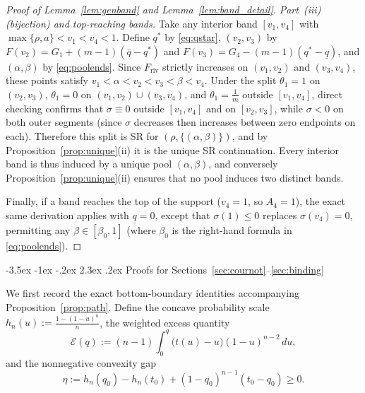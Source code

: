 \documentclass[12pt]{article}
\makeatletter
\theoremstyle{mystyle}
\theoremstyle{mystyle2}
\newcommand{\mmpfont}{\scshape}
\renewcommand\section{\@startsection {section}{1}{\z@}%
                                   {-3.5ex \@plus -1ex \@minus -.2ex}%
                                   {2.3ex \@plus .2ex}%
                                   {\normalfont\large\mmpfont}}
\newcommand{\1}{\mathbf{1}}
\makeatother
\begin{document}
\begin{proof}[Proof of Lemma~\ref{lem:genband} and Lemma~\ref{lem:band_detail}]
\emph{Part~(iii) (bijection) and top-reaching bands.} Take any interior band $[v_1,v_4]$ with $\max\{\rho,a\}<v_1<v_4<1$. Define $q^*$ by \eqref{eq:qstar}, $(v_2,v_3)$ by $F(v_2)=G_1+(m-1)(\bar q-q^*)$ and $F(v_3)=G_4-(m-1)(q^*-\underline q)$, and $(\alpha,\beta)$ by \eqref{eq:poolends}. Since $F_{\mathrm{riv}}$ strictly increases on $(v_1,v_2)$ and $(v_3,v_4)$, these points satisfy $v_1<\alpha<v_2<v_3<\beta<v_4$. Under the split $\theta_1=1$ on $(v_2,v_3)$, $\theta_1=0$ on $(v_1,v_2)\cup(v_3,v_4)$, and $\theta_1=\frac{1}{m}$ outside $[v_1,v_4]$, direct checking confirms that $\sigma\equiv 0$ outside $[v_1,v_4]$ and on $[v_2,v_3]$, while $\sigma<0$ on both outer segments (since $\sigma$ decreases then increases between zero endpoints on each). Therefore this split is SR for $(\rho,\{(\alpha,\beta)\})$, and by Proposition~\ref{prop:unique}(ii) it is the unique SR continuation. Every interior band is thus induced by a unique pool $(\alpha,\beta)$, and conversely Proposition~\ref{prop:unique}(ii) ensures that no pool induces two distinct bands.

Finally, if a band reaches the top of the support ($v_4=1$, so $A_4=1$), the exact same derivation applies with $\underline q=0$, except that $\sigma(1)\le 0$ replaces $\sigma(v_4)=0$, permitting any $\beta\in[\beta_0,1]$ (where $\beta_0$ is the right-hand formula in \eqref{eq:poolends}).
\end{proof}

\section{Proofs for Sections~\ref{sec:cournot}--\ref{sec:binding}} \label{app:interim}

We first record the exact bottom-boundary identities accompanying Proposition~\ref{prop:path}. Define the concave probability scale $h_n(u):=\frac{1-(1-u)^n}{n}$, the weighted excess quantity
\[
\mathcal E(q) := (n-1)\int_0^q \bigl(t(u)-u\bigr)(1-u)^{n-2}\,du,
\]
and the nonnegative convexity gap
\[
\eta := h_n(q_0) - h_n(t_0) + (1-q_0)^{n-1}(t_0 - q_0) \ge 0.
\]
\end{document}
